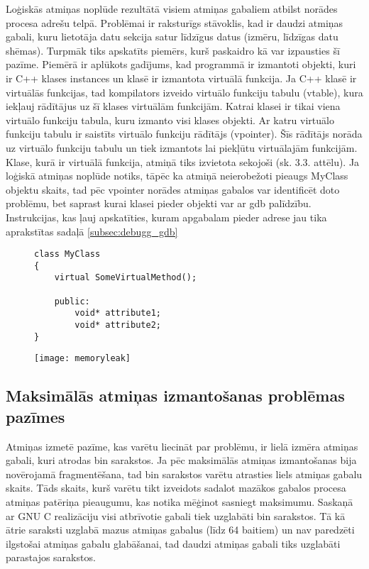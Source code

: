 Loģiskās atmiņas noplūde rezultātā visiem atmiņas gabaliem atbilst norādes procesa adrešu telpā.
Problēmai ir raksturīgs stāvoklis, kad ir daudzi atmiņas gabali, kuru lietotāja datu sekcija satur līdzīgus datus (izmēru, līdzīgas datu shēmas).
Turpmāk tiks apskatīts piemērs, kurš paskaidro kā var izpausties šī pazīme.
Piemērā ir aplūkots gadījums, kad programmā ir izmantoti objekti, kuri ir  C++ klases instances un klasē ir izmantota virtuālā funkcija.
Ja C++ klasē ir virtuālās funkcijas, tad kompilators izveido virtuālo funkciju tabulu (vtable), kura iekļauj rādītājus uz šī klases virtuālām funkcijām.
 Katrai klasei ir tikai viena virtuālo funkciju tabula, kuru izmanto visi klases objekti.
 Ar katru virtuālo funkciju tabulu ir saistīts virtuālo funkciju rādītājs (vpointer).
 Šīs rādītājs norāda uz virtuālo funkciju tabulu un tiek izmantots lai piekļūtu virtuālajām funkcijām.
Klase, kurā ir virtuālā funkcija, atmiņā tiks izvietota sekojoši (sk. 3.3. attēlu).
Ja loģiskā atmiņas noplūde notiks, tāpēc ka atmiņā neierobežoti pieaugs MyClass objektu skaits, tad pēc vpointer norādes atmiņas gabalos var identificēt doto problēmu, bet saprast kurai klasei pieder objekti var ar gdb palīdzību.
Instrukcijas, kas ļauj apskatīties, kuram apgabalam pieder adrese jau tika aprakstītas sadaļā \ref{subsec:debugg_gdb}
\begin{figure}[h]
\begin{lstlisting}
class MyClass
{
    virtual SomeVirtualMethod();

    public:
        void* attribute1;
        void* attribute2;
}
\end{lstlisting}
\end{figure}
\begin{figure}[h]
\begin{center}
\texttt{[image: memoryleak]}
\end{center}
\caption{\textbf{\fontsize{11}{12}\selectfont {C++ klases ar virtuālo funkciju izvietojums atmiņā }}}
\label{fig:memoryleak}
\end{figure}



\subsection{Maksimālās atmiņas izmantošanas problēmas pazīmes}
Atmiņas izmetē pazīme, kas varētu liecināt par problēmu, ir lielā izmēra atmiņas gabali, kuri atrodas bin sarakstos.
Ja pēc maksimālās atmiņas izmantošanas bija novērojamā fragmentēšana, tad bin sarakstos varētu atrasties liels atmiņas gabalu skaits.
Tāds skaits, kurš varētu tikt izveidots sadalot mazākos gabalos procesa atmiņas patēriņa pieaugumu, kas notika mēģinot sasniegt maksimumu.
Saskaņā ar GNU C realizāciju visi atbrīvotie gabali tiek uzglabāti bin sarakstos.
Tā kā ātrie saraksti uzglabā mazus atmiņas gabalus (līdz 64 baitiem) un nav paredzēti ilgstošai atmiņas gabalu glabāšanai, tad daudzi atmiņas gabali tiks uzglabāti parastajos sarakstos.

